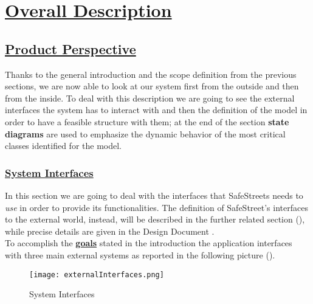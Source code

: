 \section[Overall Description]{\hyperlink{toc}{Overall Description}}
\label{sec:overallDescription}
\subsection[Product Perspective]{\hyperlink{toc}{Product Perspective}}
	Thanks to the general introduction and the scope definition from the previous sections, we are now able to look at our system first from the outside and then from the inside. To deal with this description we are going to see the external interfaces the system has to interact with and then the definition of the model in order to have a feasible structure with them; at the end of the section \textbf{state diagrams} are used to emphasize the dynamic behavior of the most critical classes identified for the model.
	\subsubsection[System Interfaces]{\hyperlink{toc}{System Interfaces}}
		\label{sec:systemInterfaces}
		In this section we are going to deal with the interfaces that SafeStreets needs to \emph{use} in order to provide its functionalities. The definition of SafeStreet's interfaces to the external world, instead, will be described in the further related section (), while precise details are given in the Design Document \cite{DD}.\\
	
		To accomplish the \hyperref[sec:goals]{\textbf{goals}} stated in the introduction the application interfaces with three main external systems as reported in the following picture ().  
		\vspace{0,3cm}
		
		\begin{figure}[h]
			\centering
			\texttt{[image: externalInterfaces.png]}
			\caption{\label{fig:systemInterfaces}System Interfaces}
		\end{figure}
		
